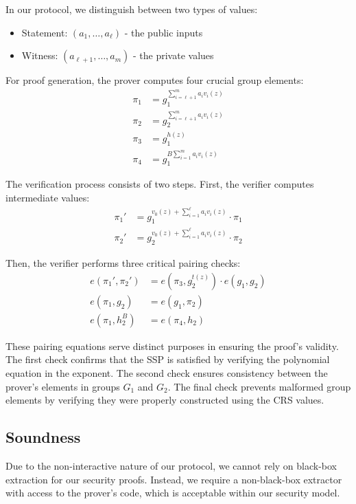 \documentclass[12pt]{tufte-book}
\begin{document}
In our protocol, we distinguish between two types of values:
\begin{itemize}
    \item Statement: $(a_1, \dots, a_\ell)$ - the public inputs
    \item Witness: $(a_{\ell+1}, \dots, a_m)$ - the private values
\end{itemize}

For proof generation, the prover computes four crucial group elements:
\begin{align*}
    \pi_1 &= g_1^{\sum_{i=\ell+1}^m a_i v_i(z)} \\
    \pi_2 &= g_2^{\sum_{i=\ell+1}^m a_i v_i(z)} \\
    \pi_3 &= g_1^{h(z)} \\
    \pi_4 &= g_1^{B\sum_{i=1}^m a_i v_i(z)}
\end{align*}

The verification process consists of two steps. First, the verifier computes intermediate values:
\begin{align*}
    \pi_1' &= g_1^{v_0(z) + \sum_{i=1}^\ell a_i v_i(z)} \cdot \pi_1 \\
    \pi_2' &= g_2^{v_0(z) + \sum_{i=1}^\ell a_i v_i(z)} \cdot \pi_2
\end{align*}

Then, the verifier performs three critical pairing checks:
\begin{align*}
    e(\pi_1', \pi_2') &= e(\pi_3, g_2^{t(z)}) \cdot e(g_1, g_2) \\
    e(\pi_1, g_2) &= e(g_1, \pi_2) \\
    e(\pi_1, h_2^B) &= e(\pi_4, h_2)
\end{align*}

These pairing equations serve distinct purposes in ensuring the proof's validity. The first check confirms that the SSP is satisfied by verifying the polynomial equation in the exponent. The second check ensures consistency between the prover's elements in groups $G_1$ and $G_2$. The final check prevents malformed group elements by verifying they were properly constructed using the CRS values.

\subsection{Soundness}

Due to the non-interactive nature of our protocol, we cannot rely on black-box extraction for our security proofs. Instead, we require a non-black-box extractor with access to the prover's code, which is acceptable within our security model.
\end{document}
